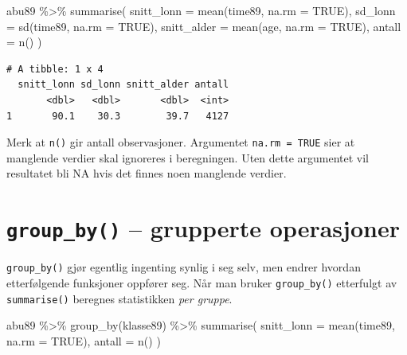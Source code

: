 \documentclass[
  norsk,
  letterpaper,
  DIV=11,
  numbers=noendperiod]{scrreprt}
\newenvironment{Shaded}{\begin{snugshade}}{\end{snugshade}}
\newcommand{\AttributeTok}[1]{\textcolor[rgb]{0.40,0.45,0.13}{#1}}
\newcommand{\ConstantTok}[1]{\textcolor[rgb]{0.56,0.35,0.01}{#1}}
\newcommand{\FunctionTok}[1]{\textcolor[rgb]{0.28,0.35,0.67}{#1}}
\newcommand{\NormalTok}[1]{\textcolor[rgb]{0.00,0.23,0.31}{#1}}
\newcommand{\SpecialCharTok}[1]{\textcolor[rgb]{0.37,0.37,0.37}{#1}}
\theoremstyle{definition}
\theoremstyle{remark}
\begin{document}
\begin{Shaded}
\begin{Highlighting}[]
\NormalTok{abu89 }\SpecialCharTok{\%\textgreater{}\%}
  \FunctionTok{summarise}\NormalTok{(}
    \AttributeTok{snitt\_lonn =} \FunctionTok{mean}\NormalTok{(time89, }\AttributeTok{na.rm =} \ConstantTok{TRUE}\NormalTok{),}
    \AttributeTok{sd\_lonn    =} \FunctionTok{sd}\NormalTok{(time89, }\AttributeTok{na.rm =} \ConstantTok{TRUE}\NormalTok{),}
    \AttributeTok{snitt\_alder =} \FunctionTok{mean}\NormalTok{(age, }\AttributeTok{na.rm =} \ConstantTok{TRUE}\NormalTok{),}
    \AttributeTok{antall     =} \FunctionTok{n}\NormalTok{()}
\NormalTok{  )}
\end{Highlighting}
\end{Shaded}

\begin{verbatim}
# A tibble: 1 x 4
  snitt_lonn sd_lonn snitt_alder antall
       <dbl>   <dbl>       <dbl>  <int>
1       90.1    30.3        39.7   4127
\end{verbatim}

Merk at \texttt{n()} gir antall observasjoner. Argumentet
\texttt{na.rm\ =\ TRUE} sier at manglende verdier skal ignoreres i
beregningen. Uten dette argumentet vil resultatet bli NA hvis det finnes
noen manglende verdier.

\section{\texorpdfstring{\texttt{group\_by()} -- grupperte
operasjoner}{group\_by() -- grupperte operasjoner}}\label{group_by-grupperte-operasjoner}

\texttt{group\_by()} gjør egentlig ingenting synlig i seg selv, men
endrer hvordan etterfølgende funksjoner oppfører seg. Når man bruker
\texttt{group\_by()} etterfulgt av \texttt{summarise()} beregnes
statistikken \emph{per gruppe}.

\begin{Shaded}
\begin{Highlighting}[]
\NormalTok{abu89 }\SpecialCharTok{\%\textgreater{}\%}
  \FunctionTok{group\_by}\NormalTok{(klasse89) }\SpecialCharTok{\%\textgreater{}\%}
  \FunctionTok{summarise}\NormalTok{(}
    \AttributeTok{snitt\_lonn =} \FunctionTok{mean}\NormalTok{(time89, }\AttributeTok{na.rm =} \ConstantTok{TRUE}\NormalTok{),}
    \AttributeTok{antall     =} \FunctionTok{n}\NormalTok{()}
\NormalTok{  )}
\end{Highlighting}
\end{Shaded}
\end{document}

